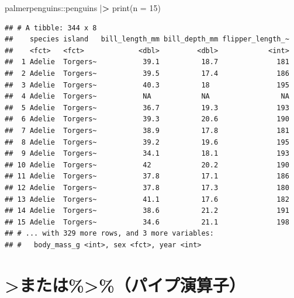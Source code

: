\documentclass[
  xelatex,ja=standard, b5paper]{bxjsbook}
\newenvironment{Shaded}{\begin{snugshade}}{\end{snugshade}}
\newcommand{\AttributeTok}[1]{\textcolor[rgb]{0.77,0.63,0.00}{#1}}
\newcommand{\DecValTok}[1]{\textcolor[rgb]{0.00,0.00,0.81}{#1}}
\newcommand{\ErrorTok}[1]{\textcolor[rgb]{0.64,0.00,0.00}{\textbf{#1}}}
\newcommand{\FunctionTok}[1]{\textcolor[rgb]{0.00,0.00,0.00}{#1}}
\newcommand{\NormalTok}[1]{#1}
\newcommand{\SpecialCharTok}[1]{\textcolor[rgb]{0.00,0.00,0.00}{#1}}
\begin{document}
\begin{Shaded}
\begin{Highlighting}[]
\NormalTok{palmerpenguins}\SpecialCharTok{::}\NormalTok{penguins  }\SpecialCharTok{|}\ErrorTok{\textgreater{}}  
  \FunctionTok{print}\NormalTok{(}\AttributeTok{n =} \DecValTok{15}\NormalTok{)}
\end{Highlighting}
\end{Shaded}

\begin{verbatim}
## # A tibble: 344 x 8
##    species island   bill_length_mm bill_depth_mm flipper_length_~
##    <fct>   <fct>             <dbl>         <dbl>            <int>
##  1 Adelie  Torgers~           39.1          18.7              181
##  2 Adelie  Torgers~           39.5          17.4              186
##  3 Adelie  Torgers~           40.3          18                195
##  4 Adelie  Torgers~           NA            NA                 NA
##  5 Adelie  Torgers~           36.7          19.3              193
##  6 Adelie  Torgers~           39.3          20.6              190
##  7 Adelie  Torgers~           38.9          17.8              181
##  8 Adelie  Torgers~           39.2          19.6              195
##  9 Adelie  Torgers~           34.1          18.1              193
## 10 Adelie  Torgers~           42            20.2              190
## 11 Adelie  Torgers~           37.8          17.1              186
## 12 Adelie  Torgers~           37.8          17.3              180
## 13 Adelie  Torgers~           41.1          17.6              182
## 14 Adelie  Torgers~           38.6          21.2              191
## 15 Adelie  Torgers~           34.6          21.1              198
## # ... with 329 more rows, and 3 more variables:
## #   body_mass_g <int>, sex <fct>, year <int>
\end{verbatim}

\hypertarget{p-pipe}{%
\section{\textbar\textgreater または\%\textgreater\%（パイプ演算子）}\label{p-pipe}}
\end{document}
